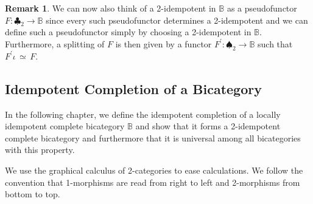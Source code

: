 \documentclass[12pt,oneside,reqno,a4paper]{article}
\theoremstyle{definition}
\newtheorem{remark}[theorem]{Remark}
\newcommand{\clb}{\clubsuit}
\newcommand{\spd}{\spadesuit}
\renewcommand{\equiv}{\,\simeq\,}
\newcommand{\bB}{\mathbb{B}}
\newcommand{\p}{^\prime}
\begin{document}
\begin{remark}\label{ExtIsSplit}
We can now also think of a 2-idempotent in $\bB$ as a pseudofunctor $F:\clb_2\to\bB$ since every such pseudofunctor determines a 2-idempotent and we can define such a pseudofunctor simply by choosing a 2-idempotent in $\bB$. Furthermore, a splitting of $F$ is then given by a functor $F\p:\spd_2\to\bB$ such that $F\p\iota\equiv F$.
\end{remark}

\subsection{Idempotent Completion of a Bicategory}

In the following chapter, we define the idempotent completion of a locally idempotent complete bicategory $\bB$ and show that it forms a 2-idempotent complete bicategory and furthermore that it is universal among all bicategories with this property.

We use the graphical calculus of 2-categories to ease calculations. We follow the convention that 1-morphisms are read from right to left and 2-morphisms from bottom to top.
\end{document}
